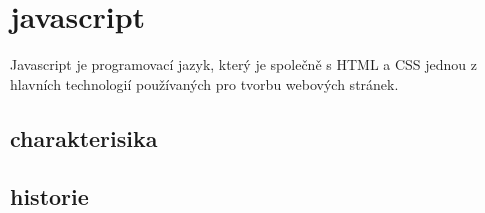 \documentclass[main.tex]{subfiles}
\begin{document}
\section{javascript}
Javascript je programovací jazyk, který je společně s HTML a CSS jednou z hlavních technologií používaných pro tvorbu webových stránek.

\subsection{charakterisika}



\subsection{historie}
\end{document}
